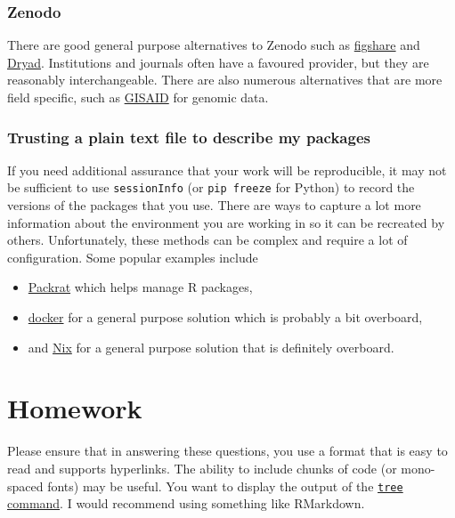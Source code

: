 \documentclass[11pt,onecolumn]{scrartcl}
\begin{document}
\subsubsection*{Zenodo}
\label{sec:orgfda500d}

There are good general purpose alternatives to Zenodo such as \href{https://figshare.com/}{figshare} and
\href{http://datadryad.org/}{Dryad}. Institutions and journals often have a favoured provider, but they are
reasonably interchangeable. There are also numerous alternatives that are more
field specific, such as \href{http://www.gisaid.org/}{GISAID} for genomic data.

\subsubsection*{Trusting a plain text file to describe my packages}
\label{sec:org497920b}

If you need additional assurance that your work will be reproducible, it may not
be sufficient to use \texttt{sessionInfo} (or \texttt{pip freeze} for Python) to record the
versions of the packages that you use. There are ways to capture a lot more
information about the environment you are working in so it can be recreated by
others. Unfortunately, these methods can be complex and require a lot of
configuration. Some popular examples include

\begin{itemize}
\item \href{http://rstudio.github.io/packrat/}{Packrat} which helps manage R packages,
\item \href{https://www.docker.com/}{docker} for a general purpose solution which is probably a bit overboard,
\item and \href{https://nixos.org/}{Nix} for a general purpose solution that is definitely overboard.
\end{itemize}

\section{Homework}
\label{sec:org0dff573}

Please ensure that in answering these questions, you use a format that is easy
to read and supports hyperlinks. The ability to include chunks of code (or
mono-spaced fonts) may be useful. You want to display the output of the \href{https://en.wikipedia.org/wiki/Tree\_(command)}{\texttt{tree}
command}. I would recommend using something like RMarkdown.
\end{document}
